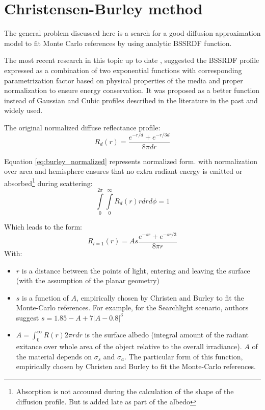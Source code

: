\section{Christensen-Burley method}
The general problem discussed here is a search for a good diffusion
approximation model to fit Monte Carlo references by using analytic BSSRDF function.

The most recent research in this topic up to date
\cite{Christensen:2015:ARP:2775280.2792555}, \cite{Burley:disney_siggraph15}
suggested the \gls{BSSRDF} profile expressed as a combination of two exponential
functions with corresponding parametrization factor based on physical properties
of the media and proper normalization to ensure energy conservation. It was
proposed as a better function instead of Gaussian and Cubic profiles described
in the literature in the past and widely used.

The original normalized diffuse reflectance profile:
\begin{equation}\label{eq:burley_normalized}
R_d(r) = \dfrac{e^{-r/d}+e^{-r/3d}}{8\pi dr}
\end{equation}

Equation \eqref{eq:burley_normalized} represents normalized form.
with normalization over area and hemisphere ensures that no extra radiant energy
is emitted or absorbed\footnote{Absorption is not accouned during the
calculation of the shape of the diffusion profile. But is added late as
part of the albedo} during scattering:
\[
\int\limits_0^{2\pi}\int\limits_0^\infty R_d(r)rdrd\phi = 1
\]

Which leads to the form:
\begin{equation}\label{eq:burley}
R_{l=1}(r) = As\dfrac{e^{-sr}+e^{-sr/3}}{8\pi r}
\end{equation}
With:
\begin{itemize}
    \item{$r$ is a distance between the points of light, entering and leaving
    the surface (with the assumption of the planar geometry)}
    \item{$s$ is a function of $A$, empirically chosen by Christen and Burley
    to fit the Monte-Carlo references. For example, for the Searchlight
    scenario, authors suggest $s = 1.85 - A + 7|A-0.8|^3$}
    \item{ $A=\int_0^{\infty} R(r)2\pi rdr$ is the surface albedo (integral
    amount of the radiant exitance over whole area of the object relative to the
    overall irradiance). $A$ of the material depends on $\sigma_s$ and
    $\sigma_a$. The particular form of this function, empirically chosen by
    Christen and Burley to fit the Monte-Carlo references.}
\end{itemize}

